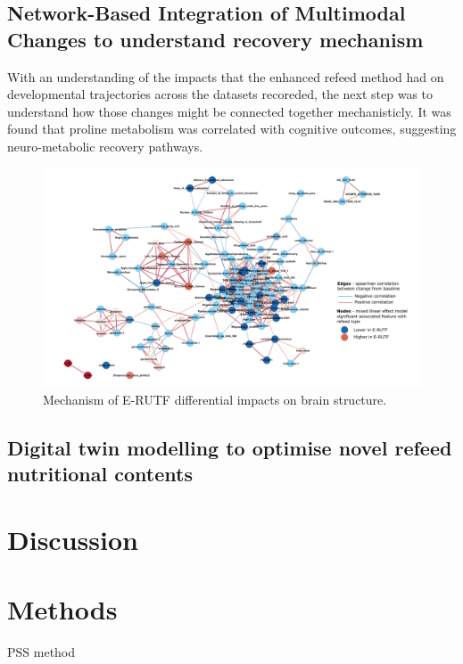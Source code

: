 \documentclass{article}
\begin{document}
\subsection*{Network-Based Integration of Multimodal Changes to understand recovery mechanism}
With an understanding of the impacts that the enhanced refeed method had on developmental trajectories across the datasets recoreded, the next step was to understand how those changes might be connected together mechanisticly.
It was found that proline metabolism was correlated with cognitive outcomes, suggesting neuro-metabolic recovery pathways.

\begin{figure}[H]
\centering
\includegraphics[scale=0.5]{figures/mixedmodelnetwork}
	\caption[Mechanism of E-RUTF differential impacts on brain structure]{
		Mechanism of E-RUTF differential impacts on brain structure.
	}
\label{Figure4}
\end{figure}

\subsection*{Digital twin modelling to optimise novel refeed nutritional contents}

\section*{Discussion}

\section*{Methods}
PSS method \cite{mozumder2022reliability}
\end{document}
